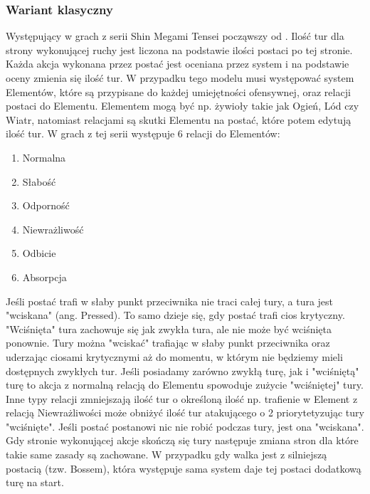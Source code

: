 \documentclass{SGGW-thesis}
\begin{document}
\subsubsection{Wariant klasyczny}
Występujący w grach z serii Shin Megami Tensei począwszy od \cite{SMT3}. Ilość tur dla strony wykonującej ruchy jest liczona na podstawie ilości postaci po tej stronie. Każda akcja wykonana przez postać jest oceniana przez system i na podstawie oceny zmienia się ilość tur. W przypadku tego modelu musi występować system 
Elementów, które są przypisane do każdej umiejętności ofensywnej, oraz relacji postaci do Elementu. Elementem mogą być np. żywioły takie jak Ogień, Lód czy Wiatr, natomiast relacjami są skutki Elementu na postać, które potem edytują ilość tur. W grach z tej serii występuje 6 relacji do Elementów:
\begin{enumerate}
  \item{Normalna}
  \item{Słabość}
  \item{Odporność}
  \item{Niewrażliwość}
  \item{Odbicie}
  \item{Absorpcja}
\end{enumerate}
Jeśli postać trafi w słaby punkt przeciwnika nie traci całej tury, a tura jest "wciskana" (ang. Pressed). To samo dzieje się, gdy postać trafi cios krytyczny. "Wciśnięta" tura zachowuje się jak zwykła tura, ale nie może być wciśnięta ponownie. Tury można "wciskać" trafiając w słaby punkt przeciwnika oraz uderzając ciosami krytycznymi aż do momentu, w którym nie będziemy mieli dostępnych zwykłych tur.
Jeśli posiadamy zarówno zwykłą turę, jak i "wciśniętą" turę to akcja z normalną relacją do Elementu spowoduje zużycie "wciśniętej" tury. Inne typy relacji zmniejszają ilość tur o określoną ilość np. trafienie w Element z relacją Niewrażliwości może obniżyć ilość tur atakującego o 2 priorytetyzując tury "wciśnięte".
Jeśli postać postanowi nic nie robić podczas tury, jest ona "wciskana". Gdy stronie wykonującej akcje skończą się tury następuje zmiana stron dla które takie same zasady są zachowane. W przypadku gdy walka jest z silniejszą postacią (tzw. Bossem), która występuje sama system daje tej postaci dodatkową turę na start.
\end{document}
